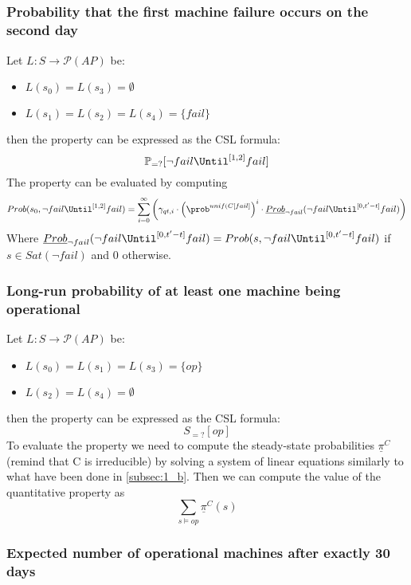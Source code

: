 \subsection{}

\subsubsection*{Probability that the first machine failure occurs on the second day}

Let $L : S \to \mathscr{P}(AP)$ be:
\begin{itemize}
	\item $L(s_0)=L(s_3) = \emptyset$
	\item $L(s_1)=L(s_2) = L(s_4) =  \{fail\}$
\end{itemize}
then the property can be expressed as the CSL formula:
\[
	\mathbb{P}_{=?}[ \neg fail \Until^{[1,2]} fail ]
\]
The property can be evaluated by computing
\[
	Prob(s_0, \neg fail \Until^{[1,2]} fail) =
	\sum_{i=0}^\infty\left( \gamma_{qt,i}\cdot \left( \prob^{unif(C[fail]} \right) ^i\cdot\underline{Prob}_{\neg fail}(\neg fail \Until^{[0,t'-t]} fail)\right)
\]
Where $\underline{Prob}_{\neg fail}(\neg fail \Until^{[0,t'-t]} fail) =
	Prob(s, \neg fail \Until^{[0,t'-t]} fail)$ if $s \in Sat(\neg fail)$ and $0$ otherwise.

\subsubsection*{Long-run probability of at least one machine being operational}

Let $L : S \to \mathscr{P}(AP)$ be:
\begin{itemize}
	\item $L(s_0) = L(s_1) = L(s_3) = \{op\}$
	\item $L(s_2) = L(s_4) =  \emptyset$
\end{itemize}
then the property can be expressed as the CSL formula:
\[
	S_{=?}[ op ]
\]
To evaluate the property we need to compute the steady-state probabilities
$\underline{\pi}^C$ (remind that C is irreducible) by solving a system of
linear equations similarly to what have been done in \ref{subsec:1_b}.
Then we can compute the value of the quantitative property as
\[
	\sum_{s \vDash op} \underline{\pi}^C(s)
\]

\subsubsection*{Expected number of operational machines after exactly 30 days}

